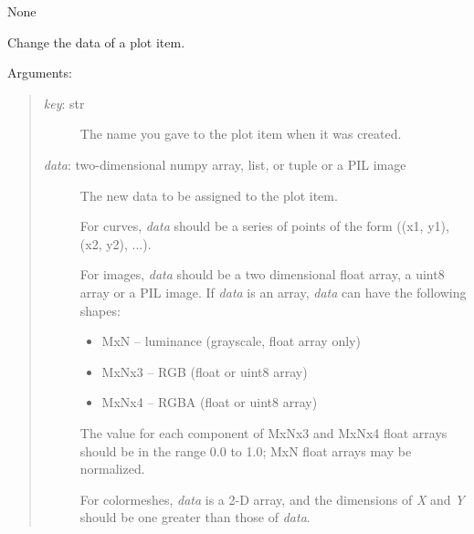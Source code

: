 \documentclass[letterpaper,10pt,english]{sphinxmanual}
\begin{document}
\begin{fulllineitems}
\begin{fulllineitems}
\begin{quote}
\begin{description}
\end{description}
\end{quote}

\end{fulllineitems}


\begin{fulllineitems}
\label{api:controls.Plot2D.scroll_action}
None

\end{fulllineitems}


\begin{fulllineitems}
\label{api:controls.Plot2D.set_data}
Change the data of a plot item.

Arguments:
\begin{quote}
\begin{description}
\item[{\emph{key}: str}] \leavevmode
The name you gave to the plot item when it was created.

\item[{\emph{data}: two-dimensional numpy array, list, or tuple or a PIL image}] \leavevmode
The new data to be assigned to the plot item.

For curves, \emph{data} should be a series of points 
of the form ((x1, y1), (x2, y2), ...).

For images, \emph{data} should be a two dimensional float array, a uint8 
array or a PIL image. If \emph{data} is an array, \emph{data} can have the 
following shapes:
\begin{itemize}
\item {} 
MxN -- luminance (grayscale, float array only)

\item {} 
MxNx3 -- RGB (float or uint8 array)

\item {} 
MxNx4 -- RGBA (float or uint8 array)

\end{itemize}

The value for each component of MxNx3 and MxNx4 float arrays should be
in the range 0.0 to 1.0; MxN float arrays may be normalized.

For colormeshes, \emph{data} is a 2-D array, and the dimensions of \emph{X} 
and \emph{Y} should be one greater than those of \emph{data}.


\end{description}
\end{quote}
\end{fulllineitems}
\end{fulllineitems}
\end{document}

